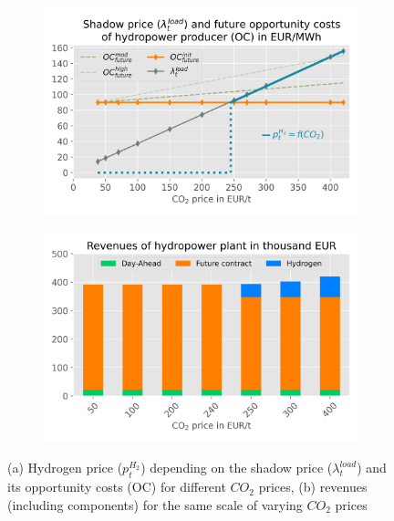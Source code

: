 \documentclass[review]{elsarticle}
\begin{document}
\begin{figure}[h]
	\begin{subfigure}[c]{1\textwidth}
		\centering
		\includegraphics[width=0.8\linewidth]{figures/Break even.png}
		\label{fig:price}
	\end{subfigure}
	\newline
	\newline
	
	\begin{subfigure}[c]{\textwidth}
		\centering
		\includegraphics[width=0.8\linewidth]{figures/Revenues.png}
		\label{fig:revenues}
	\end{subfigure}
	\caption{(a) Hydrogen price ($p_{t}^{H_2}$) depending on the shadow price ($\lambda_{t}^{load}$) and its opportunity costs (OC) for different $CO_2$ prices, (b) revenues (including components) for the same scale of varying $CO_2$ prices}
	\label{fig_results2}
\end{figure}
\cleardoublepage
\end{document}
